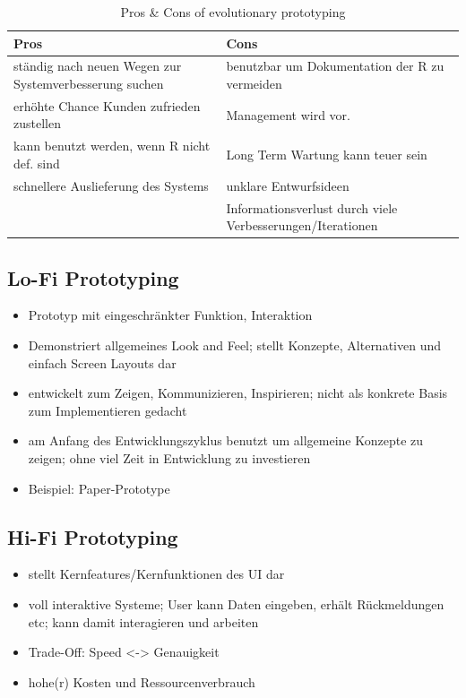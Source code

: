 \begin{table}[!h]
	\centering
	\begin{tabular}{|p{20em}|p{20em}|}
		\hline
		\textbf{Pros}	& \textbf{Cons}\\
		\hline
		ständig nach neuen Wegen zur Systemverbesserung suchen & benutzbar um Dokumentation der R zu vermeiden\\
		\hline
		erhöhte Chance Kunden zufrieden zustellen & Management wird vor.\\
		\hline
		kann benutzt werden, wenn R nicht def. sind & Long Term Wartung kann teuer sein\\
		\hline
		schnellere Auslieferung des Systems & unklare Entwurfsideen\\
		\hline
		& Informationsverlust durch viele Verbesserungen/Iterationen\\
		\hline
	\end{tabular}
	\caption{Pros \& Cons of evolutionary prototyping}
\end{table}

\subsection{Lo-Fi Prototyping}
\begin{itemize}
	\item Prototyp mit eingeschränkter Funktion, Interaktion
	\item Demonstriert allgemeines Look and Feel; stellt Konzepte, Alternativen und einfach Screen Layouts dar
	\item entwickelt zum Zeigen, Kommunizieren, Inspirieren; nicht als konkrete Basis zum Implementieren gedacht
	\item am Anfang des Entwicklungszyklus benutzt um allgemeine Konzepte zu zeigen; ohne viel Zeit in Entwicklung zu investieren
	\item Beispiel: Paper-Prototype
\end{itemize}

\subsection{Hi-Fi Prototyping}
\begin{itemize}
	\item stellt Kernfeatures/Kernfunktionen des UI dar
	\item voll interaktive Systeme; User kann Daten eingeben, erhält Rückmeldungen etc; kann damit interagieren und arbeiten
	\item Trade-Off: Speed <-> Genauigkeit
	\item hohe(r) Kosten und Ressourcenverbrauch
\end{itemize}

